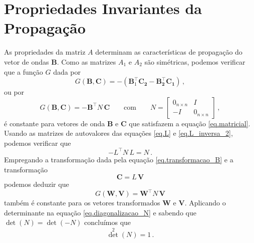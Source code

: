 \section{Propriedades Invariantes da Propaga\c{c}\~ao}
As propriedades da matriz $A$ determinam as caracter\'isticas de propaga\c{c}\~ao do vetor de ondas $\mathbf{B}$. Como as matrizes $A_1$ e $A_2$ s\~ao sim\'etricas, podemos verificar que a fun\c{c}\~ao $G$ dada por
\begin{equation*}
G(\mathbf{B},\mathbf{C})=-(\mathbf{B}_1^\top\mathbf{C_2-\mathbf{B}_2^\top\mathbf{C}_1})\,,
\end{equation*}
ou por
\begin{equation*}
G(\mathbf{B},\mathbf{C})=-\mathbf{B}^\top N\,\mathbf{C}\qquad\text{com}\qquad N=
\begin{bmatrix}
0_{n\times n}&I\\
-I&0_{n\times n}
\end{bmatrix}\,,
\end{equation*}
\'e constante para vetores de onda $\mathbf{B}$ e $\mathbf{C}$ que satisfazem a equa\c{c}\~ao \ref{eq.matricial}. Usando as matrizes de autovalores das equa\c{c}\~oes \ref{eq.L} e \ref{eq.L_inversa_2}, podemos verificar que
\begin{equation}\label{eq.diagonalizacao_N}
-L^\top N\,L=N\,.
\end{equation}
Empregando a transforma\c{c}\~ao dada pela equa\c{c}\~ao \ref{eq.transformacao_B} e a transforma\c{c}\~ao
\begin{equation*}
\mathbf{C}=L\,\mathbf{V}
\end{equation*}
podemos deduzir que 
\begin{equation}\label{eq.G(V,W)}
G(\mathbf{W},\mathbf{V})=\mathbf{W}^\top N\,\mathbf{V}
\end{equation}
tamb\'em \'e constante para os vetores transformados $\mathbf{W}$ e $\mathbf{V}$.
Aplicando o determinante na equa\c{c}\~ao \ref{eq.diagonalizacao_N} e sabendo que $\det(N)=\det(-N)$ conclu\'imos que
\begin{equation*}
{\det}^2(N)=1\,.
\end{equation*}

